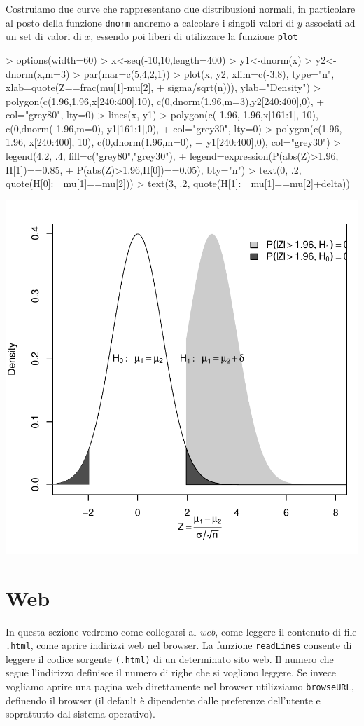 \documentclass[onecolumn,11pt]{book}
\begin{document}
 Costruiamo due curve che rappresentano due distribuzioni normali, in particolare al posto della funzione \texttt{dnorm} andremo a calcolare i singoli valori di $y$ associati ad un set di valori di
$x$, essendo poi liberi di utilizzare la funzione \texttt{plot}
 

\begin{Schunk}
\begin{Sinput}
> options(width=60)
> x<-seq(-10,10,length=400)
> y1<-dnorm(x)
> y2<-dnorm(x,m=3)
> par(mar=c(5,4,2,1))  
> plot(x, y2, xlim=c(-3,8), type="n", xlab=quote(Z==frac(mu[1]-mu[2],
+ sigma/sqrt(n))), ylab="Density")
> polygon(c(1.96,1.96,x[240:400],10), c(0,dnorm(1.96,m=3),y2[240:400],0),
+ col="grey80", lty=0)  
> lines(x, y1)
> polygon(c(-1.96,-1.96,x[161:1],-10), c(0,dnorm(-1.96,m=0), y1[161:1],0),
+ col="grey30", lty=0)
> polygon(c(1.96, 1.96, x[240:400], 10), c(0,dnorm(1.96,m=0),
+ y1[240:400],0), col="grey30")
> legend(4.2, .4, fill=c("grey80","grey30"),
+ legend=expression(P(abs(Z)>1.96, H[1])==0.85,
+ P(abs(Z)>1.96,H[0])==0.05), bty="n")
> text(0, .2, quote(H[0]:~~mu[1]==mu[2]))
> text(3, .2, quote(H[1]:~~mu[1]==mu[2]+delta))
\end{Sinput}
\end{Schunk}
\includegraphics{statisticaconR-368}


\section{Web}
In questa sezione vedremo come collegarsi al \emph{web}, come leggere il contenuto di file \texttt{.html}, come aprire indirizzi web nel browser.
La funzione \texttt{readLines} consente di leggere il codice sorgente \texttt{(.html)} di un determinato sito web. Il numero che segue l'indirizzo definisce il numero di righe che si vogliono leggere.
Se invece vogliamo aprire una pagina web direttamente nel browser utilizziamo \texttt{browseURL},
definendo il browser (il default \`e dipendente dalle preferenze dell'utente e soprattutto dal sistema operativo).
\end{document}
